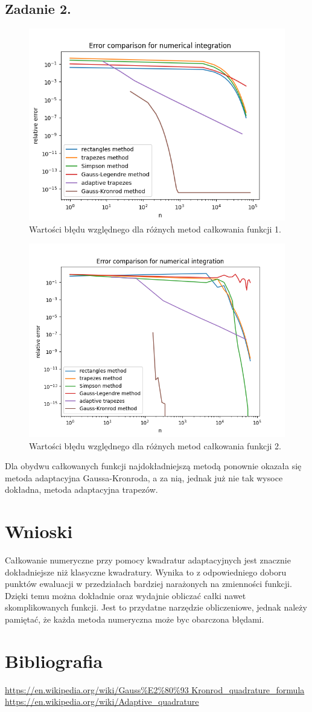 \documentclass[11pt]{scrartcl}
\begin{document}
    \subsection{Zadanie 2.}
    \begin{figure}[H]
        \centering
        \includegraphics[width=0.7\linewidth]{integration2_2.png}
        \caption{Wartości błędu względnego dla różnych metod
            całkowania funkcji 1.}
    \end{figure}
    \begin{figure}[H]
        \centering
        \includegraphics[width=0.7\linewidth]{integration2_3.png}
        \caption{Wartości błędu względnego dla różnych metod
            całkowania funkcji 2.}
    \end{figure}

    Dla obydwu całkowanych funkcji najdokładniejszą metodą ponownie
    okazała się metoda adaptacyjna Gaussa-Kronroda, a za nią, jednak
    już nie tak wysoce dokładna, metoda adaptacyjna trapezów.

    \section{Wnioski}
    Całkowanie numeryczne przy pomocy kwadratur adaptacyjnych jest
    znacznie dokładniejsze niż klasyczne kwadratury. Wynika to
    z odpowiedniego doboru punktów ewaluacji w przedziałach bardziej
    narażonych na zmienności funkcji. Dzięki temu można dokładnie
    oraz wydajnie obliczać całki nawet skomplikowanych funkcji. Jest
    to przydatne narzędzie obliczeniowe, jednak należy pamiętać, że
    każda metoda numeryczna może byc obarczona błędami.

    \section{Bibliografia}
    \url{https://en.wikipedia.org/wiki/Gauss\%E2\%80\%93
        Kronrod_quadrature_formula} \\
    \url{https://en.wikipedia.org/wiki/Adaptive_quadrature}
\end{document}
